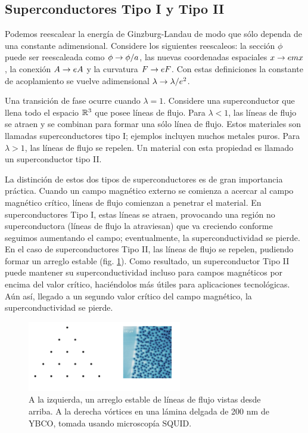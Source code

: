 \subsection{Superconductores Tipo I y Tipo II}

Podemos reescalear la energía de Ginzburg-Landau de modo que sólo dependa de una constante adimensional. Considere los siguientes reescaleos: la sección $\phi$ puede ser reescaleada como $\phi\rightarrow\phi/a$, las nuevas coordenadas espaciales $x\rightarrow emx$, la conexión $A\rightarrow eA$ y la curvatura $F\rightarrow eF$. Con estas definiciones la constante de acoplamiento se vuelve adimensional $\lambda\rightarrow\lambda/e^2$.

Una transición de fase ocurre cuando $\lambda=1$. Considere una superconductor que llena todo el espacio $\mathbb{R}^3$ que posee líneas de flujo. Para $\lambda<1$, las líneas de flujo se atraen y se combinan para formar una sólo línea de flujo. Estos materiales son llamadas superconductores tipo I; ejemplos incluyen muchos metales puros. Para $\lambda>1$, las líneas de flujo se repelen. Un material con esta propiedad es llamado un superconductor tipo II.

La distinción de estos dos tipos de superconductores es de gran importancia práctica. Cuando un campo magnético externo se comienza a acercar al campo magnético crítico, líneas de flujo comienzan a penetrar el material. En superconductores Tipo I, estas líneas se atraen, provocando una región no superconductora (líneas de flujo la atraviesan) que va creciendo conforme seguimos aumentando el campo; eventualmente, la superconductividad se pierde. En el caso de superconductores Tipo II, las líneas de flujo se repelen, pudiendo formar un arreglo estable (fig. \ref{fig:4}). Como resultado, un superconductor Tipo II puede mantener su superconductividad incluso para campos magnéticos por encima del valor crítico, haciéndolos más útiles para aplicaciones tecnológicas.  Aún así, llegado a un segundo valor crítico del campo magnético, la superconductividad se pierde.

\begin{figure}[ht]
	\centering
	\includegraphics[width=0.6\textwidth]{gfx/type2superconductor.png}
	\caption{A la izquierda, un arreglo estable de líneas de flujo vistas desde arriba. A la derecha vórtices en una lámina delgada de 200 nm de YBCO, tomada usando microscopía SQUID.}
	\label{fig:4}
\end{figure}


